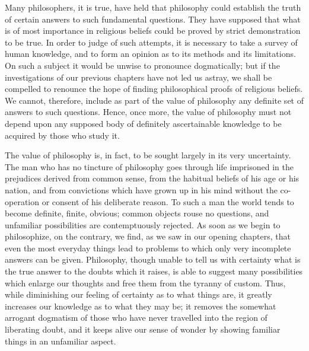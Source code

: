\documentclass[oneside,letterpaper,12pt]{book}
\begin{document}
Many philosophers, it is true, have held that philosophy could establish
the truth of certain answers to such fundamental questions. They have
supposed that what is of most importance in religious beliefs could be
proved by strict demonstration to be true. In order to judge of such
attempts, it is necessary to take a survey of human knowledge, and to
form an opinion as to its methods and its limitations. On such a subject
it would be unwise to pronounce dogmatically; but if the investigations
of our previous chapters have not led us astray, we shall be compelled
to renounce the hope of finding philosophical proofs of religious
beliefs. We cannot, therefore, include as part of the value of
philosophy any definite set of answers to such questions. Hence, once
more, the value of philosophy must not depend upon any supposed body of
definitely ascertainable knowledge to be acquired by those who study it.

The value of philosophy is, in fact, to be sought largely in its very
uncertainty. \label{prison} The man who has no tincture of philosophy goes through life
imprisoned in the prejudices derived from common sense, from the
habitual beliefs of his age or his nation, and from convictions which
have grown up in his mind without the co-operation or consent of his
deliberate reason. To such a man the world tends to become definite,
finite, obvious; common objects rouse no questions, and unfamiliar
possibilities are contemptuously rejected. As soon as we begin to
philosophize, on the contrary, we find, as we saw in our opening
chapters, that even the most everyday things lead to problems to which
only very incomplete answers can be given. Philosophy, though unable to
tell us with certainty what is the true answer to the doubts which it
raises, is able to suggest many possibilities which enlarge our thoughts
and free them from the tyranny of custom. Thus, while diminishing our
feeling of certainty as to what things are, it greatly increases our
knowledge as to what they may be; it removes the somewhat arrogant
dogmatism of those who have never travelled into the region of
liberating doubt, and it keeps alive our sense of wonder by showing
familiar things in an unfamiliar aspect. \label{antidogma}
\end{document}
